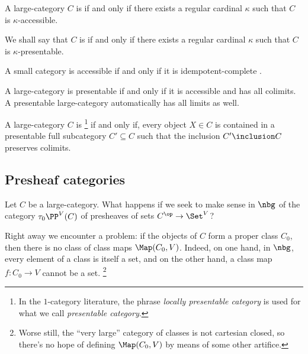 \begin{definition}
	A large-category $ C $ is  if and only if
	there exists a regular cardinal $ \kappa $ such that
	$ C $ is $ \kappa $-accessible.

	We shall say that $ C $ is  if and only if
	there exists a regular cardinal $ \kappa $ such that
	$ C $ is $ \kappa $-presentable.
\end{definition}

\begin{eg}
	A small category is accessible if and only if it is idempotent-complete
	\citep[Corollary 5.4.3.6]{Lurie2009}.
\end{eg}

\begin{nul}
	A large-category is presentable if and only if
	it is accessible and has all colimits.
	A presentable large-category automatically has all limits as well.
\end{nul}

\begin{definition}
	A large-category $ C $ is %
	\footnote{In the $1$-category literature,
		the phrase \emph{locally presentable category} is used for
		what we call \emph{presentable category}.}
	if and only if, every object $ X \in C $
	is contained in a presentable full subcategory $ C' \subseteq C $
	such that the inclusion $ C' \inclusion C $ preserves colimits.
\end{definition}

\subsection{Presheaf categories}%
\label{sub:presheaf_categories}

Let $ C $ be a large-category.
What happens if we seek to make sense in $ \nbg $
of the category $ \tau_0\PP^V(C) $ of presheaves of sets
$ C^{\op} \to \Set^V $?

Right away we encounter a problem:
if the objects of $ C $ form a proper class $ C_ 0 $,
then there is no class of class maps $ \Map(C_0, V) $.
Indeed, on one hand, in $ \nbg $, every element of a class is itself a set,
and on the other hand, a class map $ f \colon C_0 \to V $ cannot be a set.%
\footnote{Worse still, the \enquote{very large}
	category of classes is not cartesian closed,
	so there's no hope of defining
	$ \Map(C_0, V) $ by means of some other artifice.}

